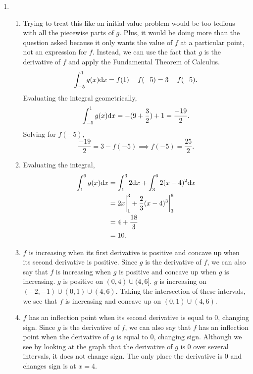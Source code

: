 \begin{enumerate}
	\item \begin{enumerate}
		\item Trying to treat this like an initial value problem would be too tedious with all the piecewise parts of $g$.
			Plus, it would be doing more than the question asked because it only wants the value of $f$ at a particular point, not an expression for $f$.
			Instead, we can use the fact that $g$ is the derivative of $f$ and apply the Fundamental Theorem of Calculus.
			\begin{equation*}
				\int_{-5}^{1}{g(x)\mathrm{d} x} = f(1) - f(-5) = 3 - f(-5).
			\end{equation*}
			Evaluating the integral geometrically,
			\begin{equation*}
				\int_{-5}^{1}{g(x)\mathrm{d} x} = -(9+\frac{3}{2}) + 1 = \frac{-19}{2}.
			\end{equation*}
			Solving for $f(-5)$,
			\begin{equation*}
				\frac{-19}{2} = 3 - f(-5) \implies f(-5) = \frac{25}{2}.
			\end{equation*}
		\item Evaluating the integral,
			\begin{align*}
				\int_{1}^{6}{g(x)\mathrm{d} x} &= \int_{1}^{3}{2\mathrm{d} x} + \int_{3}^{6}{2(x-4)^2\mathrm{d} x} \\
				&= 2x\biggr\rvert_{1}^{3} + \frac{2}{3}(x-4)^3\biggr\rvert_{3}^{6} \\
				&= 4 + \frac{18}{3} \\
				&= 10.
			\end{align*}
		\item $f$ is increasing when its first derivative is positive and concave up when its second derivative is positive.
			Since $g$ is the derivative of $f$, we can also say that $f$ is increasing when $g$ is positive and concave up when $g$ is increasing.
			$g$ is positive on $(0,4) \cup (4,6]$.
			$g$ is increasing on $(-2,-1) \cup (0,1) \cup (4,6)$.
			Taking the intersection of these intervals, we see that $f$ is increasing and concave up on $(0,1) \cup (4,6)$.
		\item $f$ has an inflection point when its second derivative is equal to 0, changing sign.
			Since $g$ is the derivative of $f$, we can also say that $f$ has an inflection point when the derivative of $g$ is equal to 0, changing sign.
			Although we see by looking at the graph that the derivative of $g$ is 0 over several intervals, it does not change sign.
			The only place the derivative is 0 and changes sign is at $x=4$.
	\end{enumerate}


\end{enumerate}
